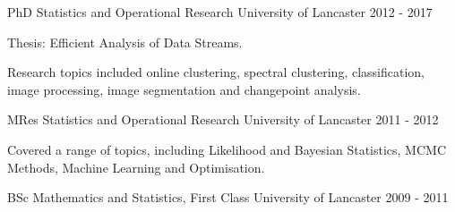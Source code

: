 \begin{cventries}
  \cventry
    {PhD Statistics and Operational Research}
    {University of Lancaster}
    {}
    {2012 - 2017}
    {
      \begin{cvitems}
              \item {Thesis: Efficient Analysis of Data Streams.}
        \item {Research topics included online clustering, spectral clustering, classification, image processing, image segmentation and changepoint analysis.}
      \end{cvitems}
    }

    \cventry
    {MRes Statistics and Operational Research}
    {University of Lancaster}
    {}
    {2011 - 2012}
    {
        \begin{cvitems}
        \item {Covered a range of topics, including Likelihood and Bayesian Statistics, MCMC Methods, Machine Learning and Optimisation.}
      \end{cvitems}
     }

    \cventry
    {BSc Mathematics and Statistics, First Class}
    {University of Lancaster}
    {}
    {2009 - 2011}
    {}
\end{cventries}
